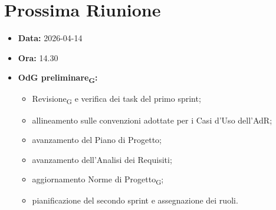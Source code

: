 \section{Prossima Riunione}
\begin{itemize}
	\item \textbf{Data:} 2026-04-14
	\item \textbf{Ora:} 14.30
	\item \textbf{OdG preliminare\textsubscript{G}:} 
	\begin{itemize}
		\item Revisione\textsubscript{G} e verifica dei task del primo sprint;
		\item allineamento sulle convenzioni adottate per i Casi d'Uso dell'AdR;
		\item avanzamento del Piano di Progetto;
		\item avanzamento dell'Analisi dei Requisiti;
		\item aggiornamento Norme di Progetto\textsubscript{G};
		\item pianificazione del secondo sprint e assegnazione dei ruoli.
	\end{itemize}   
\end{itemize}